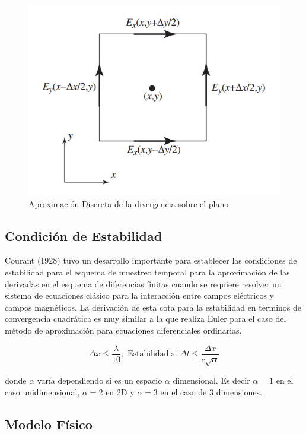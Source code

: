 \documentclass[]{article}
\begin{document}
\begin{figure}
\centering
\includegraphics{img/curl.png}
\caption{Aproximación Discreta de la divergencia sobre el plano}
\end{figure}

\subsection{Condición de Estabilidad}\label{condicion-de-estabilidad}

Courant (1928) tuvo un desarrollo importante para establecer las
condiciones de estabilidad para el esquema de muestreo temporal para la
aproximación de las derivadas en el esquema de diferencias finitas
cuando se requiere resolver un sistema de ecuaciones clásico para la
interacción entre campos eléctricos y campos magnéticos. La derivación
de esta cota para la estabilidad en términos de convergencia cuadrática
es muy similar a la que realiza Euler para el caso del método de
aproximación para ecuaciones diferenciales ordinarias.

\begin{equation}
\Delta x \leq \frac{\lambda}{10}; \text{ Estabilidad si }  \Delta t \leq  \frac{\Delta x}{c \sqrt{\alpha}}
\end{equation}

donde \(\alpha\) varía dependiendo si es un espacio \(\alpha\)
dimensional. Es decir \(\alpha=1\) en el caso unidimensional,
\(\alpha=2\) en 2D y \(\alpha=3\) en el caso de 3 dimensiones.

\subsection{Modelo Físico}\label{modelo-fisico}
\end{document}
